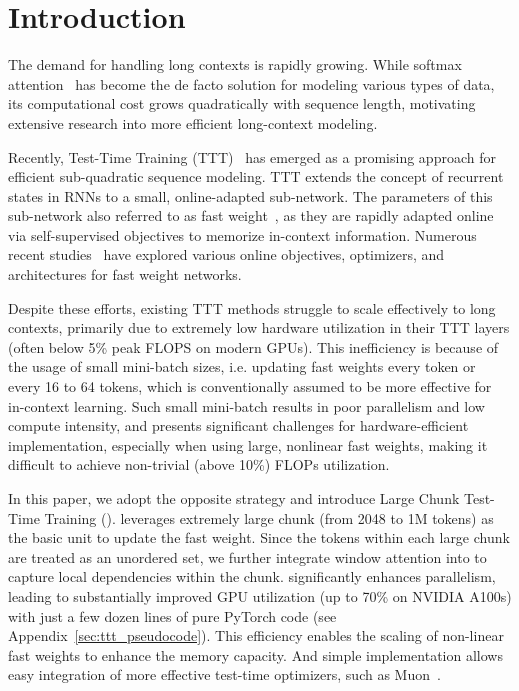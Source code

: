 \section{Introduction} \label{sec:Introduction}

The demand for handling long contexts is rapidly growing. While softmax attention~\cite{vaswani2017attention} has become the de facto solution for modeling various types of data, its computational cost grows quadratically with sequence length, motivating extensive research into more 
efficient long-context modeling.

Recently, Test-Time Training (TTT)~\cite{sun2024learning} has emerged as a promising approach for efficient sub-quadratic sequence modeling. TTT extends the concept of recurrent states in RNNs to a small, online-adapted sub-network.
The parameters of this sub-network also referred to as fast weight~\cite{schlag2021linear}, as they are rapidly adapted online via self-supervised objectives to memorize in-context information. 
Numerous recent studies~\cite{wang2025testtimeregressionunifyingframework,behrouz2024titans,behrouz2025itsconnectedjourneytesttime, karami2025lattice} have explored various online objectives, optimizers, and architectures for fast weight networks.

Despite these efforts, existing TTT methods struggle to scale effectively to long contexts, primarily due to extremely low hardware utilization in their TTT layers (often below 5\% peak FLOPS on modern GPUs). 
This inefficiency is because of the usage of
small mini-batch sizes, i.e. updating fast weights every token or every 16 to 64 tokens, which is conventionally assumed to be more effective for in-context learning.
Such small mini-batch results in poor parallelism and low compute intensity, and presents significant challenges for hardware-efficient 
implementation, especially when using large, nonlinear fast weights, making it difficult to achieve non-trivial (above 10\%) FLOPs utilization. 


In this paper, we adopt the opposite strategy and introduce Large Chunk Test-Time Training (\methodname). 
\methodname{} leverages extremely large chunk (from 2048 to 1M tokens) as the basic unit to update the fast weight.
Since the tokens within each large chunk are treated as an unordered set, we further integrate window attention
into \methodname{} to capture local dependencies within the chunk.
\methodname{} significantly enhances parallelism, leading to substantially improved GPU utilization (up to 70\% on NVIDIA A100s)  with just a few dozen lines of pure PyTorch code (see Appendix~\ref{sec:ttt_pseudocode}).
This efficiency enables the scaling of non-linear fast weights to enhance the memory capacity. And simple implementation allows easy integration of more effective test-time optimizers, such as Muon~\cite{jordan2024muon}.

